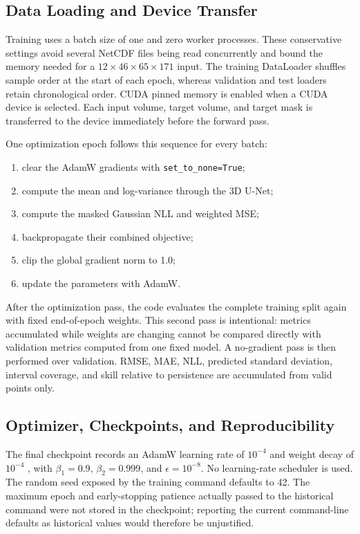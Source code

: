 \subsection{Data Loading and Device Transfer}

Training uses a batch size of one and zero worker processes. These conservative settings avoid several NetCDF files being read concurrently and bound the memory needed for a $12\times46\times65\times171$ input. The training DataLoader shuffles sample order at the start of each epoch, whereas validation and test loaders retain chronological order. CUDA pinned memory is enabled when a CUDA device is selected. Each input volume, target volume, and target mask is transferred to the device immediately before the forward pass.

One optimization epoch follows this sequence for every batch:

\begin{enumerate}
  \item clear the AdamW gradients with \texttt{set\_to\_none=True};
  \item compute the mean and log-variance through the 3D U-Net;
  \item compute the masked Gaussian NLL and weighted MSE;
  \item backpropagate their combined objective;
  \item clip the global gradient norm to 1.0;
  \item update the parameters with AdamW.
\end{enumerate}

After the optimization pass, the code evaluates the complete training split again with fixed end-of-epoch weights. This second pass is intentional: metrics accumulated while weights are changing cannot be compared directly with validation metrics computed from one fixed model. A no-gradient pass is then performed over validation. RMSE, MAE, NLL, predicted standard deviation, interval coverage, and skill relative to persistence are accumulated from valid points only.

\subsection{Optimizer, Checkpoints, and Reproducibility}

The final checkpoint records an AdamW learning rate of $10^{-4}$ and weight decay of $10^{-4}$ \citep{loshchilov2019adamw}, with $\beta_1=0.9$, $\beta_2=0.999$, and $\epsilon=10^{-8}$. No learning-rate scheduler is used. The random seed exposed by the training command defaults to 42. The maximum epoch and early-stopping patience actually passed to the historical command were not stored in the checkpoint; reporting the current command-line defaults as historical values would therefore be unjustified.

